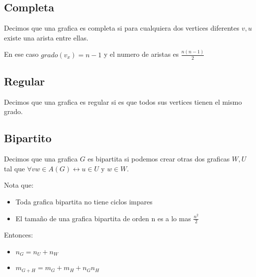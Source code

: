 \documentclass[12pt, fleqn]{report}                             %
\theoremstyle{break}                                            %
\newcommand \lIff    {\leftrightarrow}                          %
\begin{document}
            \subsection{Completa}

                Decimos que una grafica es completa si para cualquiera dos vertices
                diferentes $v, u$ existe una arista entre ellas.

                En ese caso $grado(v_x) = n - 1$
                y el numero de aristas es $\frac{n (n - 1)}{2}$

            \subsection{Regular}

                Decimos que una grafica es regular si es que todos sus vertices tienen
                el mismo grado.

            \subsection{Bipartito}

                Decimos que una grafica $G$ es bipartita si podemos crear otras dos
                graficas $W, U$ tal que $\forall vw \in A(G) \lIff u \in U \text{ y } w \in W$.

                Nota que:
                \begin{itemize}
                    \item Toda grafica bipartita no tiene ciclos impares
                    \item El tamaño de una grafica bipartita de orden n es a lo mas
                    $\frac{n^2}{2}$
                \end{itemize}

                Entonces:
                \begin{itemize}
                    \item $n_{G} = n_U + n_W$
                    \item $m_{G+H} = m_G + m_H + n_G n_H$
                \end{itemize}
\end{document}
